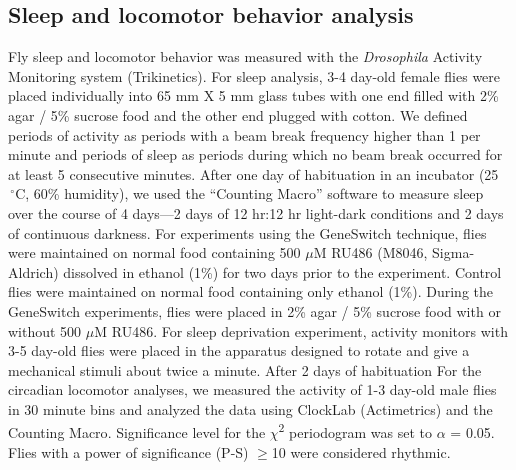 \subsection*{Sleep and locomotor behavior analysis}

Fly sleep and locomotor behavior was measured with the \emph{Drosophila} Activity Monitoring system (Trikinetics).
For sleep analysis, 3-4 day-old female flies were placed individually into 65 mm X 5 mm glass tubes with one end filled with 2\% agar / 5\% sucrose food and the other end plugged with cotton.
We defined periods of activity as periods with a beam break frequency higher than 1 per minute and periods of sleep as periods during which no beam break occurred for at least 5 consecutive minutes\cite{Shaw:2000ui}.
After one day of habituation in an incubator (25$\,^{\circ}\mathrm{C}$, 60\% humidity), we used the ``Counting Macro'' software\cite{pfeiffenberger:2010ab} to measure sleep over the course of 4 days---2 days of 12 hr:12 hr light-dark conditions and 2 days of continuous darkness.
For experiments using the GeneSwitch technique, flies were maintained on normal food containing 500 $\mu$M RU486 (M8046, Sigma-Aldrich) dissolved in ethanol (1\%) for two days prior to the experiment.
Control flies were maintained on normal food containing only ethanol (1\%).
During the GeneSwitch experiments, flies were placed in 2\% agar / 5\% sucrose food with or without 500 $\mu$M RU486.
For sleep deprivation experiment, activity monitors with 3-5 day-old flies were placed in the apparatus designed to rotate and give a mechanical stimuli about twice a minute.
After 2 days of habituation  
For the circadian locomotor analyses, we measured the activity of 1-3 day-old male flies in 30 minute bins and analyzed the data using ClockLab (Actimetrics) and the Counting Macro\cite{pfeiffenberger:2010aa}. Significance level for the $\chi$\textsuperscript{2} periodogram was set to $\alpha$ = 0.05.
Flies with a power of significance (P-S) $\geq$10 were considered rhythmic.

  